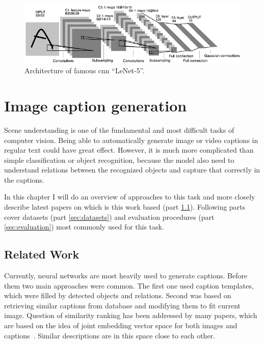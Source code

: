 \begin{figure}[!t]
	\centering
	\includegraphics[width=\textwidth]{./fig/lenet-architecture.png}
	\caption{Architecture of famous \gls{cnn} \textquotedblleft LeNet-5\textquotedblright.~\cite{lecun-98}
		\label{fig:lenet}}
\end{figure}

\chapter{Image caption generation}\label{chp:captions}

Scene understanding is one of the fundamental and most difficult tasks of computer vision. Being able to automatically generate image or video captions in regular text could have great effect. However, it is much more complicated than simple classification or object recognition, because the model also need to understand relations between the recognized objects and capture that correctly in the captions.

In this chapter I will do an overview of approaches to this task and more closely describe latest papers on which is this work based (part \ref{sec:related}). Following parts cover datasets (part \ref{sec:datasets}) and evaluation procedures (part \ref{sec:evaluation}) most commonly used for this task.

	\section{Related Work}
	\label{sec:related}

Currently, neural networks are most heavily used to generate captions. Before them two main approaches were common. The first one used caption templates, which were filled by detected objects and relations. Second was based on retrieving similar captions from database and modifying them to fit current image. Question of similarity ranking has been addressed by many papers, which are based on the idea of joint embedding vector space for both images and captions~\cite{DBLP:journals/corr/KarpathyF14}. Similar descriptions are in this space close to each other.


